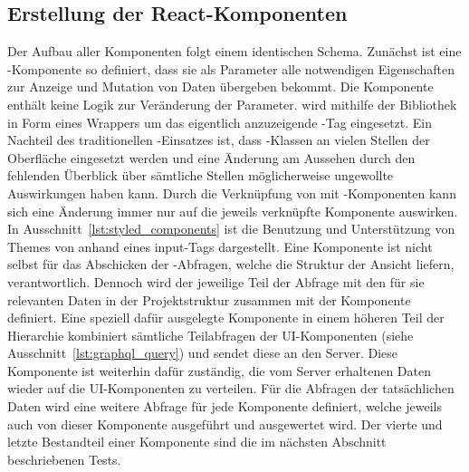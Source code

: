 \subsection{Erstellung der React-Komponenten}
Der Aufbau aller Komponenten folgt einem identischen Schema. Zunächst ist eine -Komponente so definiert, dass sie als Parameter alle notwendigen Eigenschaften zur Anzeige und Mutation von Daten übergeben bekommt. Die Komponente enthält keine Logik zur Veränderung der Parameter.
 wird mithilfe der Bibliothek  in Form eines Wrappers um das eigentlich anzuzeigende -Tag eingesetzt. Ein Nachteil des traditionellen -Einsatzes ist, dass -Klassen an vielen Stellen der Oberfläche eingesetzt werden und eine Änderung am Aussehen durch den fehlenden Überblick über sämtliche Stellen möglicherweise ungewollte Auswirkungen haben kann. Durch die Verknüpfung von  mit -Komponenten kann sich eine Änderung immer nur auf die jeweils verknüpfte Komponente auswirken. In Ausschnitt~\ref{lst:styled_components} ist die Benutzung und Unterstützung von Themes von  anhand eines  input-Tags dargestellt.
Eine Komponente ist nicht selbst für das Abschicken der -Abfragen, welche die Struktur der Ansicht liefern, verantwortlich. Dennoch wird der jeweilige Teil der Abfrage mit den für sie relevanten Daten in der Projektstruktur zusammen mit der Komponente definiert. Eine speziell dafür ausgelegte Komponente in einem höheren Teil der Hierarchie kombiniert sämtliche Teilabfragen der UI-Komponenten (siehe Ausschnitt~\ref{lst:graphql_query}) und sendet diese an den Server. Diese Komponente ist weiterhin dafür zuständig, die vom Server erhaltenen Daten wieder auf die UI-Komponenten zu verteilen. Für die Abfragen der tatsächlichen Daten wird eine weitere Abfrage für jede Komponente definiert, welche jeweils auch von dieser Komponente ausgeführt und ausgewertet wird.
Der vierte und letzte Bestandteil einer Komponente sind die im nächsten Abschnitt beschriebenen Tests.

\clearpage{}





